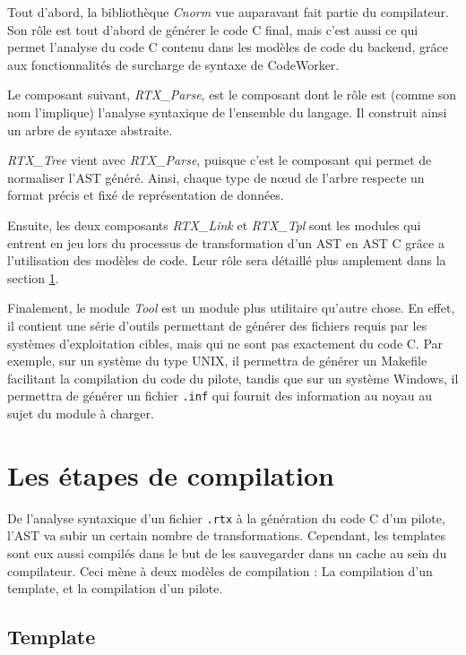\documentclass[french]{rtxreport}
\begin{document}
Tout d'abord, la bibliothèque \emph{Cnorm} vue auparavant fait partie du
compilateur. Son rôle est tout d'abord de générer le code C final, mais c'est
aussi ce qui permet l'analyse du code C contenu dans les modèles de code du
backend, grâce aux fonctionnalités de surcharge de syntaxe de CodeWorker.

Le composant suivant, \emph{RTX\_Parse}, est le composant dont le rôle est
(comme son nom l'implique) l'analyse syntaxique de l'ensemble du langage. Il
construit ainsi un arbre de syntaxe abstraite.

\emph{RTX\_Tree} vient avec \emph{RTX\_Parse}, puisque c'est le composant qui
permet de normaliser l'AST généré. Ainsi, chaque type de nœud de l'arbre
respecte un format précis et fixé de représentation de données.

Ensuite, les deux composants \emph{RTX\_Link} et \emph{RTX\_Tpl} sont les
modules qui entrent en jeu lors du processus de transformation d'un AST \rtx en
AST C grâce a l'utilisation des modèles de code. Leur rôle sera détaillé plus
amplement dans la section \ref{sec:compilationSteps}.

Finalement, le module \emph{Tool} est un module plus utilitaire qu'autre chose.
En effet, il contient une série d'outils permettant de générer des fichiers
requis par les systèmes d'exploitation cibles, mais qui ne sont pas exactement
du code C. Par exemple, sur un système du type UNIX, il permettra de générer un
Makefile facilitant la compilation du code du pilote, tandis que sur un système
Windows, il permettra de générer un fichier \texttt{.inf} qui fournit des
information au noyau au sujet du module à charger.


\section{Les étapes de compilation}
\label{sec:compilationSteps}

De l'analyse syntaxique d'un fichier \texttt{.rtx} à la génération du code C
d'un pilote, l'AST va subir un certain nombre de transformations. Cependant,
les templates sont eux aussi compilés dans le but de les sauvegarder dans un
cache au sein du compilateur. Ceci mène à deux modèles de compilation : La
compilation d'un template, et la compilation d'un pilote.

\subsection{Template}
\end{document}
